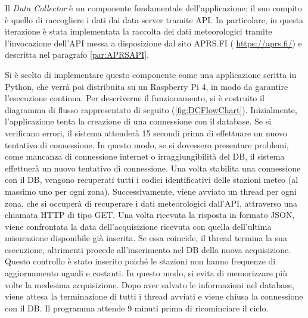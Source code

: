 Il \textit{Data Collector} è un componente fondamentale dell'applicazione: il suo compito è quello di raccogliere i dati dai data server tramite API. In particolare, in questa iterazione è stata implementata la raccolta dei dati meteorologici tramite l'invocazione dell'API messa a disposizione dal sito APRS.FI ( \url{https://aprs.fi/}) e descritta nel paragrafo \ref{par:APRSAPI}. 

Si è scelto di implementare questo componente come una applicazione scritta in Python, che verrà poi distribuita su un Raspberry Pi 4, in modo da garantire l'esecuzione continua. Per descriverne il funzionamento, si è costruito il diagramma di flusso rappresentato di seguito (\Fig\ref{fig:DCFlowChart}). Inizialmente, l'applicazione tenta la creazione di una connessione con il database. Se si verificano errori, il sistema attenderà 15 secondi prima di effettuare un nuovo tentativo di connessione. In questo modo, se si dovessero presentare problemi, come mancanza di connessione internet o irraggiungibilità del DB, il sistema effettuerà un nuovo tentativo di connessione. Una volta stabilita una connessione con il DB, vengono recuperati tutti i codici identificativi delle stazioni meteo (al massimo uno per ogni zona). Successivamente, viene avviato un thread per ogni zona, che si occuperà di recuperare i dati meteorologici dall'API, attraverso una chiamata HTTP di tipo GET. Una volta ricevuta la risposta in formato JSON, viene confrontata la data dell'acquisizione ricevuta con quella dell'ultima misurazione disponibile già inserita. Se essa coincide, il thread termina la sua esecuzione, altrimenti procede all'inserimento nel DB della nuova acquisizione. Questo controllo è stato inserito poiché le stazioni non hanno frequenze di aggiornamento uguali e costanti. In questo modo, si evita di memorizzare più volte la medesima acquisizione. Dopo aver salvato le informazioni nel database, viene attesa la terminazione di tutti i thread avviati e viene chiusa la connessione con il DB. Il programma attende 9 minuti prima di ricominciare il ciclo. 

